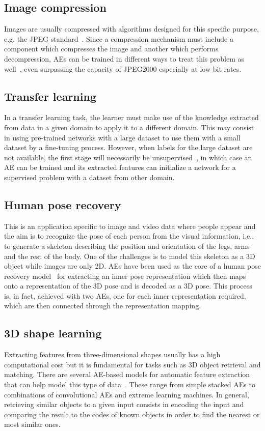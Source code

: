 \documentclass[
	fontsize=11pt, %
	twoside=false, %
	open=any, %
	secnumdepth=1, %
]{kaobook}
\begin{document}
\subsection{Image compression} Images are usually compressed with algorithms designed for this specific purpose, e.g. the JPEG standard~\cite{jpeg}. Since a compression mechanism must include a component which compresses the image and another which performs decompression, AEs can be trained in different ways to treat this problem as well~\cite{balle2016end,compression,cheng2018deep}, even surpassing the capacity of JPEG2000 especially at low bit rates.

\subsection{Transfer learning} In a transfer learning task, the learner must make use of the knowledge extracted from data in a given domain to apply it to a different domain. This may consist in using pre-trained networks with a large dataset to use them with a small dataset by a fine-tuning process. However, when labels for the large dataset are not available, the first stage will necessarily be unsupervised~\cite{bengio2012deep}, in which case an AE can be trained and its extracted features can initialize a network for a supervised problem with a dataset from other domain.

\subsection{Human pose recovery} This is an application specific to image and video data where people appear and the aim is to recognize the pose of each person from the visual information, i.e., to generate a skeleton describing the position and orientation of the legs, arms and the rest of the body. One of the challenges is to model this skeleton as a 3D object while images are only 2D. AEs have been used as the core of a human pose recovery model~\cite{hong2015multimodal} for extracting an inner pose representation which then maps onto a representation of the 3D pose and is decoded as a 3D pose. This process is, in fact, achieved with two AEs, one for each inner representation required, which are then connected through the representation mapping. 

\subsection{3D shape learning} Extracting features from three-dimen\-sional shapes usually has a high computational cost but it is fundamental for tasks such as 3D object retrieval and matching. There are several AE-based models for automatic feature extraction that can help model this type of data~\cite{3d1,3d2,3d3}. These range from simple stacked AEs to combinations of convolutional AEs and extreme learning machines. In general, retrieving similar objects to a given input consists in encoding the input and comparing the result to the codes of known objects in order to find the nearest or most similar ones.
\end{document}
